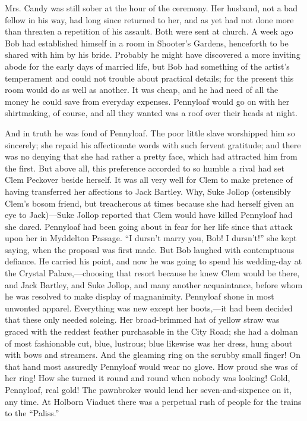 Mrs. Candy was still sober at the hour of the ceremony. Her husband, not
a bad fellow in his way, had long since returned to her, and as yet had
not done more than threaten a repetition of his assault. Both were
{\protect\hypertarget{254}{}{}}sent at church. A week ago Bob had
established himself in a room in Shooter's Gardens, henceforth to be
shared with him by his bride. Probably he might have discovered a more
inviting abode for the early days of married life, but Bob had something
of the artist's temperament and could not trouble about practical
details; for the present this room would do as well as another. It was
cheap, and he had need of all the money he could save from everyday
expenses. Pennyloaf would go on with her shirtmaking, of course, and all
they wanted was a roof over their heads at night.

And in truth he was fond of Pennyloaf. The poor little slave worshipped
him so sincerely; she repaid his affectionate words with such fervent
gratitude; and there was no denying that she had rather a pretty face,
which had attracted him from the first. But above all, this preference
accorded to so humble a rival had set Clem Peckover beside herself. It
was all very well for Clem to make pretence of having transferred her
{\protect\hypertarget{255}{}{}}affections to Jack Bartley. Why, Suke
Jollop (ostensibly Clem's bosom friend, but treacherous at times because
she had herself given an eye to Jack)---Suke Jollop reported that Clem
would have killed Pennyloaf had she dared. Pennyloaf had been going
about in fear for her life since that attack upon her in Myddelton
Passage. ``I dursn't marry you, Bob! I dursn't!'' she kept saying, when
the proposal was first made. But Bob laughed with contemptuous defiance.
He carried his point, and now he was going to spend his wedding-day at
the Crystal Palace,---choosing that resort because he knew Clem would be
there, and Jack Bartley, and Suke Jollop, and many another acquaintance,
before whom he was resolved to make display of magnanimity. Pennyloaf
shone in most unwonted apparel. Everything was new except her
boots,---it had been decided that these only needed soleing. Her
broad-brimmed hat of yellow straw was graced with the reddest feather
purchasable in the City Road; she had a dolman of most fashionable cut,
blue, lustrous; blue {\protect\hypertarget{256}{}{}}likewise was her
dress, hung about with bows and streamers. And the gleaming ring on the
scrubby small finger! On that hand most assuredly Pennyloaf would wear
no glove. How proud she was of her ring! How she turned it round and
round when nobody was looking! Gold, Pennyloaf, real gold! The
pawnbroker would lend her seven-and-sixpence on it, any time. At Holborn
Viaduct there was a perpetual rush of people for the trains to the
``Paliss.''

